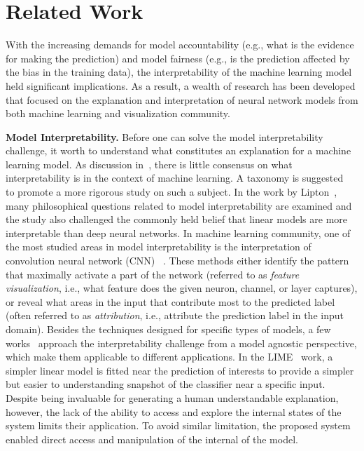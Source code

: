 
\section{Related Work}
With the increasing demands for model accountability (e.g., what is the evidence for making the prediction) and model fairness (e.g., is the prediction affected by the bias in the training data),
the interpretability of the machine learning model held significant implications. As a result, a wealth of research has been developed that focused on the explanation and interpretation of neural network models from both machine learning and visualization community.

\textbf{Model Interpretability.}
Before one can solve the model interpretability challenge, it worth to understand what constitutes an explanation for a machine learning model.
As discussion in~\cite{Lipton2016, Doshi-Velez2017}, there is little consensus on what interpretability is in the context of machine learning. A taxonomy is suggested~\cite{Doshi-Velez2017} to promote a more rigorous study on such a subject. In the work by Lipton~\cite{Lipton2016}, many philosophical questions related to model interpretability are examined and the study also challenged the commonly held belief that linear models are more interpretable than deep neural networks.
%
In machine learning community, one of the most studied areas in model interpretability is the interpretation of convolution neural network (CNN) ~\cite{SimonyanVedaldiZisserman2013, ZeilerFergus2014, YosinskiCluneNguyen2015, OlahMordvintsevSchubert2017, OlahSatyanarayanJohnson2018}.
%
These methods either identify the pattern that maximally activate a part of the network (referred to as \emph{feature visualization}, i.e., what feature does the given neuron, channel, or layer captures), or reveal what areas in the input that contribute most to the predicted label (often referred to as \emph{attribution}, i.e., attribute the prediction label in the input domain).
%
Besides the techniques designed for specific types of models, a few works~\cite{RibeiroSinghGuestrin2016, LundbergLee2017} approach the interpretability challenge from a model agnostic perspective, which make them applicable to different applications. In the LIME~\cite{RibeiroSinghGuestrin2016} work, a simpler linear model is fitted near the prediction of interests to provide a simpler but easier to understanding snapshot of the classifier near a specific input.
%
Despite being invaluable for generating a human understandable explanation, however, the lack of the ability to access and explore the internal states of the system limits their application. 
To avoid similar limitation, the proposed system enabled direct access and manipulation of the internal of the model.

